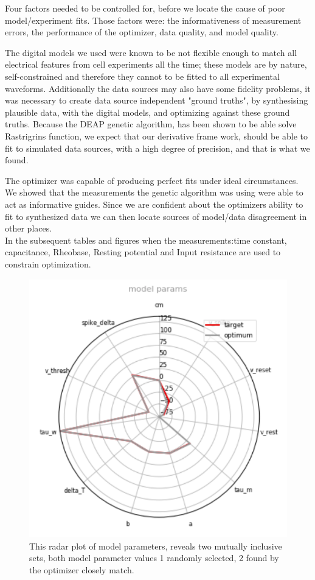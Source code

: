 




Four factors needed to be controlled for, before we locate the cause of poor model/experiment fits. Those factors were: the informativeness of measurement errors, the performance of the optimizer, data quality, and model quality.

The digital models we used were known to be not flexible enough to match all electrical features from cell experiments all the time; these models are by nature, self-constrained and therefore they cannot to be fitted to all experimental waveforms. Additionally the data sources may also have some fidelity problems, it was necessary to create data source independent "ground truths", by synthesising plausible data, with the digital models, and optimizing against these ground truths. Because the DEAP genetic algorithm, has been shown to be able solve Rastrigrins function, we expect that our derivative frame work, should be able to fit to simulated data sources, with a high degree of precision, and that is what we found.


The optimizer was capable of producing perfect fits under ideal circumstances. We showed that the measurements the genetic algorithm was using were able to act as informative guides. Since we are confident about the optimizers ability to fit to synthesized data we can then locate sources of model/data disagreement in other places. \\ 
In the subsequent tables and figures when the measurements:time constant, capacitance, Rheobase, Resting potential and Input resistance are used to constrain optimization.
\begin{figure}
    \centering
    \includegraphics{figures/radar_coordinates.png}
    \caption{This radar plot of model parameters, reveals two mutually inclusive sets, both model parameter values 1 randomly selected, 2 found by the optimizer closely match.}
    \label{fig:my_label}
\end{figure}


